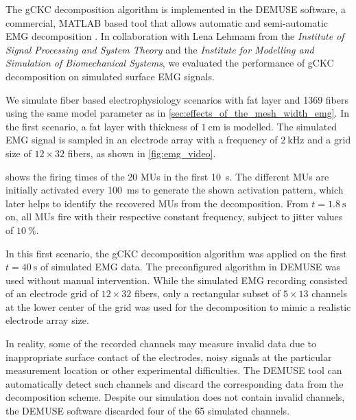 The gCKC decomposition algorithm is implemented in the DEMUSE software, a commercial, MATLAB based tool that allows automatic and semi-automatic EMG decomposition \cite{demuse}. In collaboration with Lena Lehmann from the \emph{Institute of Signal Processing and System Theory} and the \emph{Institute for Modelling and Simulation of Biomechanical Systems}, we evaluated the performance of gCKC decomposition on simulated surface EMG signals.

We simulate fiber based electrophysiology scenarios with fat layer and 1369 fibers using the same model parameter as in \cref{sec:effects_of_the_mesh_width_emg}. In the first scenario, a fat layer with thickness of $\SI{1}{\cm}$ is modelled. The simulated EMG signal is sampled in an electrode array with a frequency of $\SI{2}{\kilo\hertz}$ and a grid size of $12 \times 32$ fibers, as shown in \cref{fig:emg_video}.

 shows the firing times of the 20 MUs in the first \SI{10}{\second}. The different MUs are initially activated every \SI{100}{\ms} to generate the shown  activation pattern, which later helps to identify the recovered MUs from the decomposition.  From $t=\SI{1.8}{\second}$ on, all MUs fire with their respective constant frequency, subject to jitter values of $\SI{10}{\percent}$.

In this first scenario, the gCKC decomposition algorithm was applied on the first $t=\SI{40}{\second}$ of simulated EMG data. The preconfigured algorithm in DEMUSE was used without manual intervention. While the simulated EMG recording consisted of an electrode grid of $12 \times 32$ fibers, only a rectangular subset of $5\times 13$ channels at the lower center of the grid was used for the decomposition to mimic a realistic electrode array size. 

In reality, some of the recorded channels may measure invalid data due to inappropriate surface contact of the electrodes, noisy signals at the particular measurement location or other experimental difficulties. The DEMUSE tool can automatically detect such channels and discard the corresponding data from the decomposition scheme. Despite our simulation does not contain invalid channels, the DEMUSE software discarded four of the 65 simulated channels.

